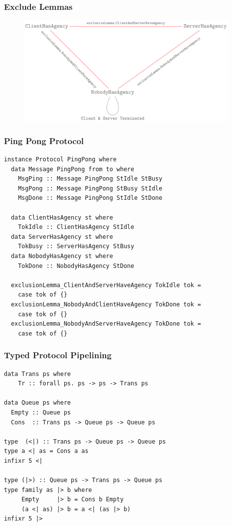 \documentclass[t,dvipsnames]{beamer}
\begin{document}
\begin{frame}
  \frametitle{Exclude Lemmas}
  \begin{figure}
    \includegraphics[width=11cm]{../images/exclusion_lemmas.png}
  \end{figure}
\end{frame}

\begin{frame}[fragile]
  \frametitle{Ping Pong Protocol}

  \begin{verbatim}
instance Protocol PingPong where
  data Message PingPong from to where
    MsgPing :: Message PingPong StIdle StBusy
    MsgPong :: Message PingPong StBusy StIdle
    MsgDone :: Message PingPong StIdle StDone

  data ClientHasAgency st where
    TokIdle :: ClientHasAgency StIdle
  data ServerHasAgency st where
    TokBusy :: ServerHasAgency StBusy
  data NobodyHasAgency st where
    TokDone :: NobodyHasAgency StDone

  exclusionLemma_ClientAndServerHaveAgency TokIdle tok =
    case tok of {}
  exclusionLemma_NobodyAndClientHaveAgency TokDone tok =
    case tok of {}
  exclusionLemma_NobodyAndServerHaveAgency TokDone tok =
    case tok of {}
  \end{verbatim}
\end{frame}

\begin{frame}[fragile]
  \frametitle{Typed Protocol Pipelining}
  \begin{verbatim}
data Trans ps where
    Tr :: forall ps. ps -> ps -> Trans ps

data Queue ps where
  Empty :: Queue ps
  Cons  :: Trans ps -> Queue ps -> Queue ps

type  (<|) :: Trans ps -> Queue ps -> Queue ps
type a <| as = Cons a as
infixr 5 <|

type (|>) :: Queue ps -> Trans ps -> Queue ps
type family as |> b where
     Empty     |> b = Cons b Empty
     (a <| as) |> b = a <| (as |> b)
infixr 5 |>
  \end{verbatim}
\end{frame}
\end{document}

